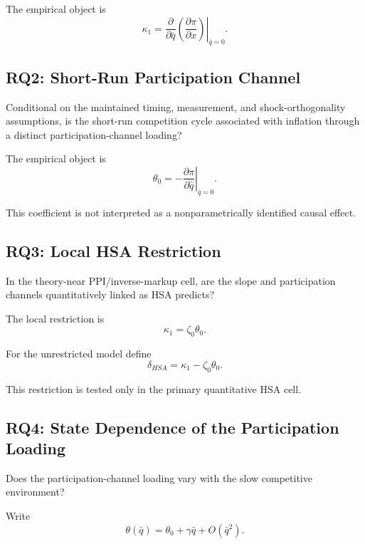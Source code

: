 \documentclass[11pt]{article}
\begin{document}
The empirical object is
\begin{equation}
\kappa_1
=
\left.
\frac{\partial}{\partial \bar q}
\left(
\frac{\partial \pi}{\partial x}
\right)
\right|_{\bar q=0}.
\end{equation}

\subsection{RQ2: Short-Run Participation Channel}

Conditional on the maintained timing, measurement, and shock-orthogonality assumptions, is the short-run competition cycle associated with inflation through a distinct participation-channel loading?

The empirical object is
\begin{equation}
\theta_0
=
-
\left.
\frac{\partial\pi}{\partial\hat q}
\right|_{\bar q=0}.
\end{equation}

This coefficient is not interpreted as a nonparametrically identified causal effect.

\subsection{RQ3: Local HSA Restriction}

In the theory-near PPI/inverse-markup cell, are the slope and participation channels quantitatively linked as HSA predicts?

The local restriction is
\begin{equation}
\boxed{
\kappa_1=\zeta_0\theta_0.
}
\label{eq:local_hsa_restriction}
\end{equation}

For the unrestricted model define
\begin{equation}
\delta_{HSA}
=
\kappa_1-\zeta_0\theta_0.
\label{eq:delta_hsa}
\end{equation}

This restriction is tested only in the primary quantitative HSA cell.

\subsection{RQ4: State Dependence of the Participation Loading}

Does the participation-channel loading vary with the slow competitive environment?

Write
\begin{equation}
\theta(\bar q)
=
\theta_0+\gamma\bar q+O(\bar q^2).
\end{equation}
\end{document}
